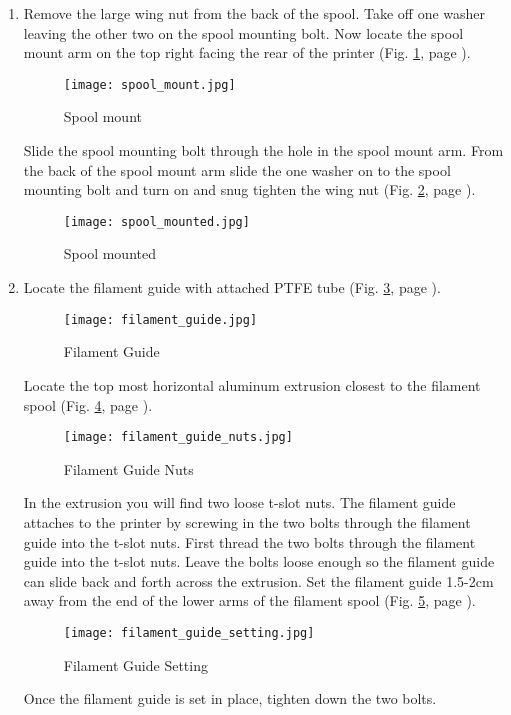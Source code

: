 \begin{enumerate}
\item Remove the large wing nut from the back of the spool. Take off one washer leaving the other two on the spool mounting bolt. Now locate the spool mount arm on the top right facing the rear of the printer
(Fig. \ref{fig:spool_mount}, page \pageref{fig:spool_mount}).
\begin{figure}[hbt]
\centering
\texttt{[image: spool\_mount.jpg]}
\caption{Spool mount}
\label{fig:spool_mount}
\end{figure}
Slide the spool mounting bolt through the hole in the spool mount arm. From the back of the spool mount arm slide the one washer on to the spool mounting bolt and turn on and snug tighten the wing nut
(Fig. \ref{fig:spool_mounted}, page \pageref{fig:spool_mounted}).
\begin{figure}[hbt]
\centering
\texttt{[image: spool\_mounted.jpg]}
\caption{Spool mounted}
\label{fig:spool_mounted}
\end{figure}

\item Locate the filament guide with attached PTFE tube
(Fig. \ref{fig:filament_guide}, page \pageref{fig:filament_guide}).
\begin{figure}[hbt]
\centering
\texttt{[image: filament\_guide.jpg]}
\caption{Filament Guide}
\label{fig:filament_guide}
\end{figure}

Locate the top most horizontal aluminum extrusion closest to the filament spool
(Fig. \ref{fig:filament_guide_nuts}, page \pageref{fig:filament_guide_nuts}).
\begin{figure}[hbt]
\centering
\texttt{[image: filament\_guide\_nuts.jpg]}
\caption{Filament Guide Nuts}
\label{fig:filament_guide_nuts}
\end{figure}

In the extrusion you will find two loose t-slot nuts. The filament guide attaches to the printer by screwing in the two bolts through the filament guide into the t-slot nuts. First thread the two bolts through the filament guide into the t-slot nuts. Leave the bolts loose enough so the filament guide can slide back and forth across the extrusion. Set the filament guide 1.5-2cm away from the end of the lower arms of the filament spool
(Fig. \ref{fig:filament_guide_setting}, page \pageref{fig:filament_guide_setting}).
\begin{figure}[hbt]
\centering
\texttt{[image: filament\_guide\_setting.jpg]}
\caption{Filament Guide Setting}
\label{fig:filament_guide_setting}
\end{figure}
Once the filament guide is set in place, tighten down the two bolts.


\end{enumerate}

